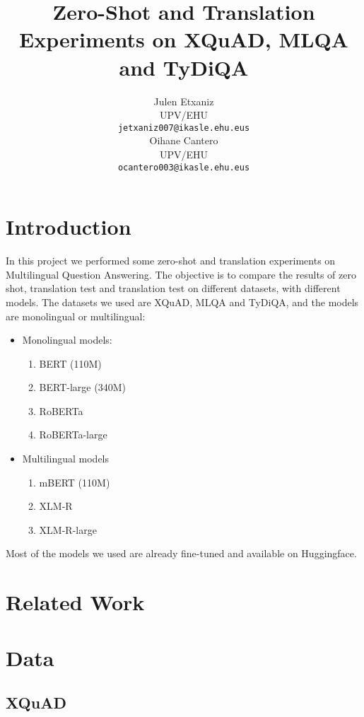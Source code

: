 \documentclass[11pt]{article}
\title{Zero-Shot and Translation Experiments on XQuAD, MLQA and TyDiQA}
\author{Julen Etxaniz \\
  UPV/EHU \\
  \texttt{jetxaniz007@ikasle.ehu.eus} \\\And
  Oihane Cantero \\
  UPV/EHU \\
  \texttt{ocantero003@ikasle.ehu.eus}}
\begin{document}
\maketitle
\begin{abstract}
\end{abstract}

\section{Introduction}

In this project we performed some zero-shot and translation experiments on Multilingual Question Answering. The objective is to compare the results of zero shot, translation test and translation test on different datasets, with different models. The datasets we used are XQuAD, MLQA and TyDiQA, and the models are monolingual or multilingual:

\begin{itemize}
    \item Monolingual models: 
    \begin{enumerate}
        \item BERT (110M)
        \item BERT-large (340M)
        \item RoBERTa
        \item RoBERTa-large
    \end{enumerate}
    \item Multilingual models
    \begin{enumerate}
        \item mBERT (110M)
        \item XLM-R
        \item XLM-R-large
    \end{enumerate}
\end{itemize}

Most of the models we used are already fine-tuned and available on Huggingface.

\section{Related Work}

\section{Data}

\subsection{XQuAD}
\end{document}
